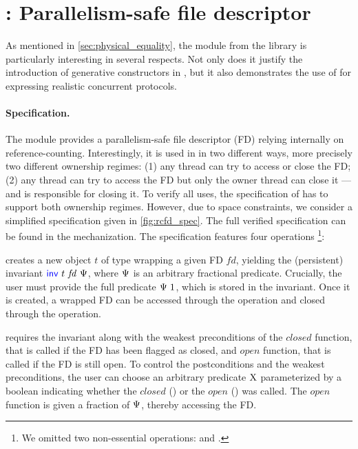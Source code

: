 \section{: Parallelism-safe file descriptor}
\label{sec:rcfd}

\newcommand{\inv}{%
  \textcolor{blue}{\textlog{inv}}%
}
\newcommand{\closing}{%
  \textcolor{red}{\textlog{closing}}%
}



As mentioned in \cref{sec:physical_equality}, the  module from the \Eio library is particularly interesting in several respects.
Not only does it justify the introduction of generative constructors in \OCaml, but it also demonstrates the use of \Iris for expressing realistic concurrent protocols.

\paragraph{Specification.}
The  module provides a parallelism-safe file descriptor (FD) relying internally on reference-counting.
Interestingly, it is used in \Eio in two different ways, more precisely two different ownership regimes: (1) any thread can try to access or close the FD; (2) any thread can try to access the FD but only the owner thread can close it --- and is responsible for closing it.
To verify all uses, the specification of  has to support both ownership regimes.
However, due to space constraints, we consider a simplified specification given in \cref{fig:rcfd_spec}.
The full verified specification can be found in the mechanization.
%
The specification features four operations%
\footnote{
We omitted two non-essential operations:  and .
}:

 creates a new object $t$ of type  wrapping a given FD $\mathit{fd}$, yielding the (persistent) invariant $\inv\ t\ \mathit{fd}\ \iPredTwo$, where $\Psi$ is an arbitrary fractional predicate.
Crucially, the user must provide the full predicate $\Psi\ 1$, which is stored in the invariant.
Once it is created, a wrapped FD can be accessed through the  operation and closed through the  operation.

 requires the invariant along with the weakest preconditions of the $\mathit{closed}$ function, that is called if the FD has been flagged as closed, and $\mathit{open}$ function, that is called if the FD is still open.
To control the postconditions and the weakest preconditions, the user can choose an arbitrary predicate $\mathrm{X}$ parameterized by a boolean indicating whether the $\mathit{closed}$ () or the $\mathit{open}$ () was called.
The $\mathit{open}$ function is given a fraction of $\Psi$, thereby accessing the FD.

